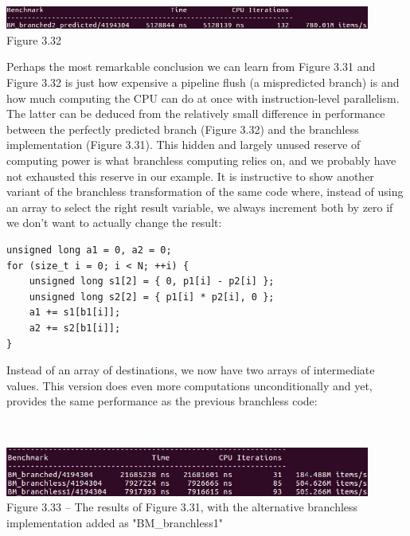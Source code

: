 \hspace*{\fill} \\ %
\begin{center}
\includegraphics[width=0.9\textwidth]{content/1/chapter3/images/32.jpg}\\
Figure 3.32
\end{center}

Perhaps the most remarkable conclusion we can learn from Figure 3.31 and Figure 3.32 is just how expensive a pipeline flush (a mispredicted branch) is and how much computing the CPU can do at once with instruction-level parallelism. The latter can be deduced from the relatively small difference in performance between the perfectly predicted branch (Figure 3.32) and the branchless implementation (Figure 3.31). This hidden and largely unused reserve of computing power is what branchless computing relies on, and we probably have not exhausted this reserve in our example. It is instructive to show another variant of the branchless transformation of the same code where, instead of using an array to select the right result variable, we always increment both by zero if we don't want to actually change the result:

\begin{lstlisting}[style=styleCXX]
unsigned long a1 = 0, a2 = 0;
for (size_t i = 0; i < N; ++i) {
	unsigned long s1[2] = { 0, p1[i] - p2[i] };
	unsigned long s2[2] = { p1[i] * p2[i], 0 };
	a1 += s1[b1[i]];
	a2 += s2[b1[i]];
}
\end{lstlisting}

Instead of an array of destinations, we now have two arrays of intermediate values. This version does even more computations unconditionally and yet, provides the same performance as the previous branchless code:

\hspace*{\fill} \\ %
\begin{center}
\includegraphics[width=0.9\textwidth]{content/1/chapter3/images/33.jpg}\\
Figure 3.33 – The results of Figure 3.31, with the alternative branchless implementation added as "BM\_branchless1"
\end{center}

